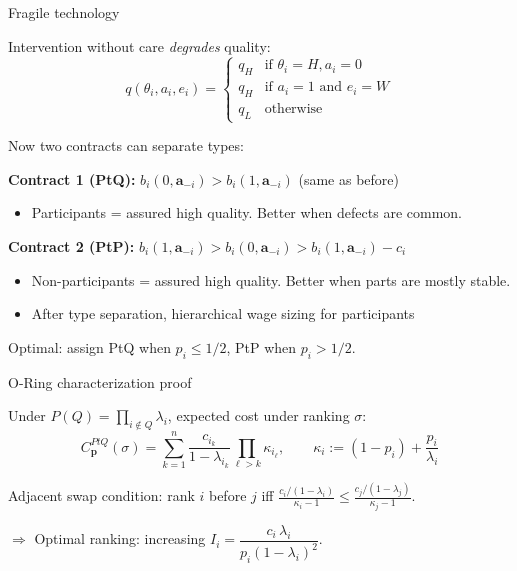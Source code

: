 \documentclass[10pt,aspectratio=169, compressed]{beamer}
\newcommand{\backupend}{
   \addtocounter{framenumberappendix}{-\value{framenumber}}
   \addtocounter{framenumber}{\value{framenumberappendix}} 
}
\begin{document}
\begin{frame}[noframenumbering]
{Fragile technology}

Intervention without care \emph{degrades} quality:
$$
q(\theta_i, a_i, e_i) = \begin{cases}
q_H & \text{if } \theta_i = H, a_i = 0 \\
q_H & \text{if } a_i = 1 \text{ and } e_i = W \\
q_L & \text{otherwise}
\end{cases}
$$

Now two contracts can separate types:

\medskip

\textbf{Contract 1 (PtQ):} $b_i(0, \mathbf{a}_{-i}) > b_i(1, \mathbf{a}_{-i})$ \quad (same as before)
\begin{itemize}
  \item Participants = assured high quality.  Better when defects are common.
\end{itemize}

\medskip

\textbf{Contract 2 (PtP):} $b_i(1, \mathbf{a}_{-i}) > b_i(0, \mathbf{a}_{-i}) > b_i(1, \mathbf{a}_{-i}) - c_i$
\begin{itemize}
  \item Non-participants = assured high quality. Better when parts are mostly stable.
  \item 	After type separation, hierarchical wage sizing for participants
\end{itemize}

\medskip

Optimal: assign PtQ when $p_i \leq 1/2$, PtP when $p_i > 1/2$.

\end{frame}










\begin{frame}[noframenumbering, label=proofsketchORING]{O-Ring characterization proof}

Under $P(Q) = \prod_{i \notin Q} \lambda_i$, expected cost under ranking $\sigma$:
$$C^{PtQ}_{\mathbf{p}}(\sigma)
= \sum_{k=1}^{n} \frac{c_{i_k}}{1 - \lambda_{i_k}} \prod_{\ell > k} \kappa_{i_\ell},
\qquad \kappa_i := (1 - p_i) + \frac{p_i}{\lambda_i}$$

\medskip

Adjacent swap condition: rank $i$ before $j$ iff
$\displaystyle\frac{c_i/(1-\lambda_i)}{\kappa_i - 1} \leq \frac{c_j/(1-\lambda_j)}{\kappa_j - 1}$.

\medskip

$\Longrightarrow$ Optimal ranking: increasing $I_i = \dfrac{c_i \, \lambda_i}{p_i(1-\lambda_i)^2}$.

\hfill\hyperlink{oring}{}
\end{frame}




\backupend
\end{document}
